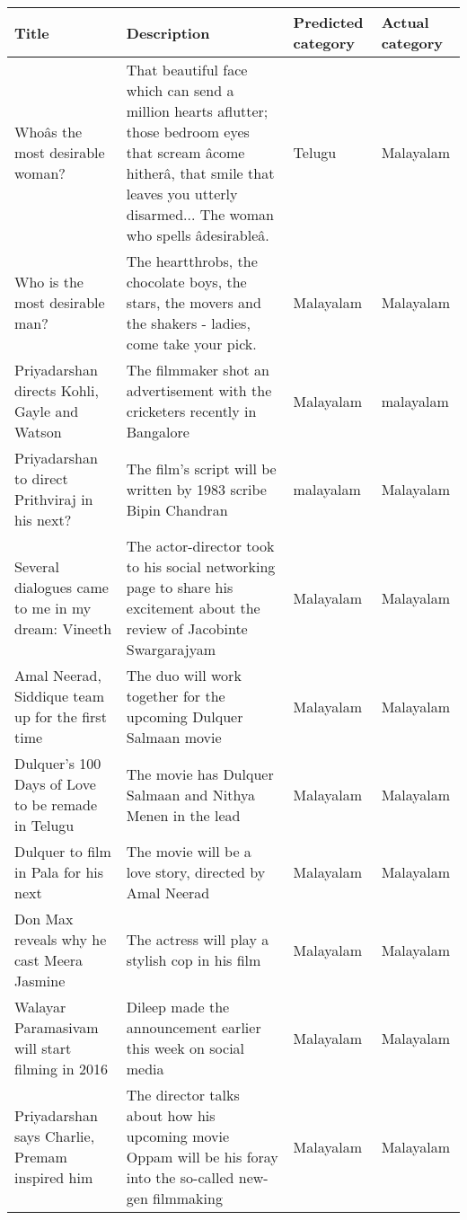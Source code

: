 \begin{itemize}
\begin{table}
\newpage
\label{}
\begin{center}
\begin{longtable}{|p{3cm}|p{7cm}|p{2cm}|p{2cm}|}
\hline
\textbf{Title} & \textbf{Description} & \textbf{Predicted category} & \textbf{Actual category} \\ \hline
 Whoâs the most desirable woman?& That beautiful face which can send a million hearts aflutter; those bedroom eyes that scream âcome hitherâ, that smile that leaves you utterly disarmed... The woman who spells âdesirableâ.&  Telugu& Malayalam\\ \hline
  Who is the most desirable man?& The heartthrobs, the chocolate boys, the stars, the movers and the shakers - ladies, come take your pick.&  Malayalam& Malayalam\\ \hline
  Priyadarshan directs Kohli, Gayle and Watson&The filmmaker shot an advertisement with the cricketers recently in Bangalore&  Malayalam& malayalam\\ \hline
  Priyadarshan to direct Prithviraj in his next?& The film's script will be written by 1983 scribe Bipin Chandran&  malayalam& Malayalam   \\ \hline
Several dialogues came to me in my dream: Vineeth& The actor-director took to his social networking page to share his excitement about the review of Jacobinte Swargarajyam& Malayalam& Malayalam\\ \hline
  Amal Neerad, Siddique team up for the first time&The duo will work together for the upcoming Dulquer Salmaan movie&  Malayalam& Malayalam\\ \hline
  Dulquer's 100 Days of Love to be remade in Telugu& The movie has Dulquer Salmaan and Nithya Menen in the lead&  Malayalam& Malayalam\\ \hline
  Dulquer to film in Pala for his next& The movie will be a love story, directed by Amal Neerad&  Malayalam& Malayalam\\ \hline
  Don Max reveals why he cast Meera Jasmine&The actress will play a stylish cop in his film&  Malayalam& Malayalam\\ \hline
  Walayar Paramasivam will start filming in 2016& Dileep made the announcement earlier this week on social media&  Malayalam& Malayalam   \\ \hline
  Priyadarshan says Charlie, Premam inspired him& The director talks about how his upcoming movie Oppam will be his foray into the so-called new-gen filmmaking&  Malayalam& Malayalam\\ \hline

\end{longtable}
\end{center}
\end{table}
\end{itemize}
